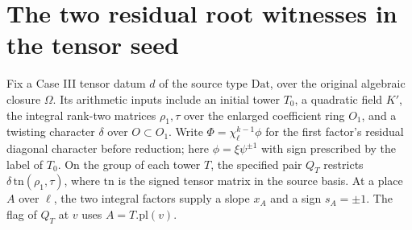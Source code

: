 \section{The two residual root witnesses in the tensor seed}

Fix a Case III tensor datum $d$ of the source type $\mathrm{Dat}$,
over the original algebraic closure $\Omega$. Its arithmetic inputs
include an initial tower $T_0$, a quadratic field $K'$, the integral
rank-two matrices $\rho_1,\tau$ over the enlarged coefficient ring
$O_1$, and a twisting character $\delta$ over $O\subset O_1$.
Write $\Phi=\chi_\ell^{k-1}\phi$ for the first factor's residual
diagonal character before reduction; here
$\phi=\xi\psi^{\pm1}$ with sign prescribed by the label of $T_0$.
On the group of each tower $T$, the specified pair $Q_T$ restricts
$\delta\,\mathrm{tn}(\rho_1,\tau)$, where $\mathrm{tn}$ is the signed
tensor matrix in the source basis. At a place $A$ over $\ell$, the
two integral factors supply a slope $x_A$ and a sign $s_A=\pm1$.
The flag of $Q_T$ at $v$ uses $A=T.\mathrm{pl}(v)$.

